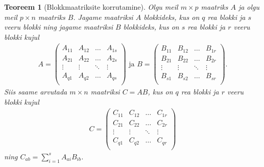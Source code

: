 \documentclass[12pt]{article}
\theoremstyle{plain}
\newtheorem{teoreem}{Teoreem}[section]
\theoremstyle{definition}
\numberwithin{equation}{section}
\begin{document}
\begin{teoreem}[Blokkmaatriksite korrutamine]
Olgu meil $m \times p$ maatriks $A$ ja olgu meil $p \times n$ maatriks 
$B$. Jagame maatriksi $A$ blokkideks, kus on $q$ rea blokki ja $s$ 
veeru blokki ning jagame maatriksi $B$ blokkideks, kus on $s$ rea 
blokki ja $r$ veeru blokki kujul
\begin{align*}
A = \begin{pmatrix}
A_{11} & A_{12} & \dots & A_{1s} \\
A_{21} & A_{22} & \dots & A_{2s} \\
\vdots & \vdots & \ddots & \vdots \\
A_{q1} & A_{q2} & \dots & A_{qs} \\
\end{pmatrix} \text{ ja }
B = \begin{pmatrix}
B_{11} & B_{12} & \dots & B_{1r} \\
B_{21} & B_{22} & \dots & B_{2r} \\
\vdots & \vdots & \ddots & \vdots \\
B_{s1} & B_{s2} & \dots & B_{sr} \\
\end{pmatrix}.
\end{align*}
Siis saame arvutada $m \times n$ maatriksi $C = AB$, kus on $q$ rea 
blokki ja $r$ veeru blokki kujul
\begin{align*}
C = \begin{pmatrix}
C_{11} & C_{12} & \dots & C_{1r} \\
C_{21} & C_{22} & \dots & C_{2r} \\
\vdots & \vdots & \ddots & \vdots \\
C_{q1} & C_{q2} & \dots & C_{qr} \\
\end{pmatrix}
\end{align*}
ning $C_{ab} = \sum_{i = 1}^{s} A_{ai} B_{ib}$.
\end{teoreem}
\end{document}
